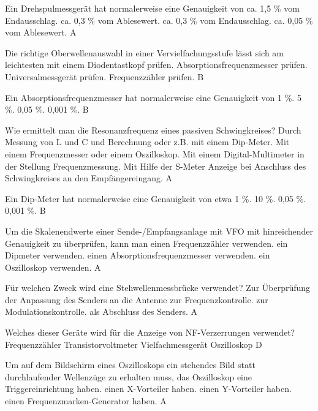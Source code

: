 {Ein Drehspulmessgerät hat normalerweise eine Genauigkeit von}%
{ca. 1,5 \% vom Endausschlag.}%
{ca. 0,3 \% vom Ablesewert.}%
{ca. 0,3 \% vom Endausschlag.}%
{ca. 0,05 \% vom Ablesewert.}%
{A}%

{Die richtige Oberwellenauswahl in einer Vervielfachungsstufe lässt sich am leichtesten mit einem}%
{Diodentastkopf prüfen.}%
{Absorptionsfrequenzmesser prüfen.}%
{Universalmessgerät prüfen.}%
{Frequenzzähler prüfen.}%
{B}%


{Ein Absorptionsfrequenzmesser hat normalerweise eine Genauigkeit von}%
{1 \%.}%
{5 \%. }%
{0,05 \%.}%
{0,001 \%.}%
{B}%


{Wie ermittelt man die Resonanzfrequenz eines passiven Schwingkreises?}%
{Durch Messung von L und C und Berechnung oder z.B. mit einem Dip-Meter.}%
{Mit einem Frequenzmesser oder einem Oszilloskop.}%
{Mit einem Digital-Multimeter in der Stellung Frequenzmessung.}%
{Mit Hilfe der S-Meter Anzeige bei Anschluss des Schwingkreises an den Empfängereingang.}%
{A}%

{Ein Dip-Meter hat normalerweise eine Genauigkeit von etwa}%
{1 \%.}%
{10 \%.}%
{0,05 \%.}%
{0,001 \%.}%
{B}%

{Um die Skalenendwerte einer Sende-/Empfangsanlage mit VFO mit hinreichender Genauigkeit zu überprüfen, kann man}%
{einen Frequenzzähler verwenden.}%
{ein Dipmeter verwenden.}%
{einen Absorptionsfrequenzmesser verwenden.}%
{ein Oszilloskop verwenden.}%
{A}%

{Für welchen Zweck wird eine Stehwellenmessbrücke verwendet?}%
{Zur Überprüfung der Anpassung des Senders an die Antenne}%
{zur Frequenzkontrolle.}%
{zur Modulationskontrolle.}%
{als Abschluss des Senders.}%
{A}%

{Welches dieser Geräte wird für die Anzeige von NF-Verzerrungen verwendet?}%
{Frequenzzähler}%
{Transistorvoltmeter}%
{Vielfachmessgerät}%
{Oszilloskop}%
{D}%

{Um auf dem Bildschirm eines Oszilloskops ein stehendes Bild statt durchlaufender Wellenzüge zu erhalten muss, das Oszilloskop}%
{eine Triggereinrichtung haben.}%
{einen X-Vorteiler haben.}%
{einen Y-Vorteiler haben. \vspace*{-0.06cm}}%
{einen Frequenzmarken-Generator haben.}%
{A}%



